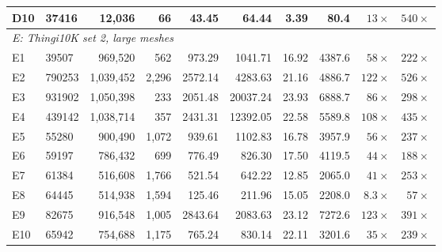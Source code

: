 \documentclass[11pt,a4paper]{article}
\begin{document}
\begin{table}[H]
{\begin{tabular}{llrrrrrrrr}
D10 & 37416 & 12{,}036 & 66  & 43.45 & 64.44  & 3.39 & 80.4  & $13\times$ & $540\times$\\
\midrule
\multicolumn{10}{l}{\textit{E: Thingi10K set 2, large meshes}}\\
E1  & 39507 & 969{,}520   & 562   & 973.29 & 1041.71 & 16.92 & 4387.6 & $58\times$ & $222\times$\\
E2  & 790253 & 1{,}039{,}452 & 2{,}296 & 2572.14 & 4283.63 & 21.16 & 4886.7 & $122\times$ & $526\times$\\
E3  & 931902 & 1{,}050{,}398 & 233   & 2051.48 & 20037.24 & 23.93 & 6888.7 & $86\times$ & $298\times$\\
E4  & 439142 & 1{,}038{,}714 & 357   & 2431.31 & 12392.05 & 22.58 & 5589.8 & $108\times$ & $435\times$\\
E5  & 55280 & 900{,}490   & 1{,}072 & 939.61 & 1102.83 & 16.78 & 3957.9 & $56\times$ & $237\times$\\
E6  & 59197 & 786{,}432   & 699   & 776.49 & 826.30  & 17.50 & 4119.5 & $44\times$ & $188\times$\\
E7  & 61384 & 516{,}608   & 1{,}766 & 521.54 & 642.22  & 12.85 & 2065.0 & $41\times$ & $253\times$\\
E8  & 64445 & 514{,}938   & 1{,}594 & 125.46 & 211.96  & 15.05 & 2208.0 & $8.3\times$ & $57\times$\\
E9  & 82675 & 916{,}548   & 1{,}005 & 2843.64 & 2083.63 & 23.12 & 7272.6 & $123\times$ & $391\times$\\
E10 & 65942 & 754{,}688   & 1{,}175 & 765.24 & 830.14  & 22.11 & 3201.6 & $35\times$ & $239\times$\\
\bottomrule
\end{tabular}
}
\end{table}
\end{document}
